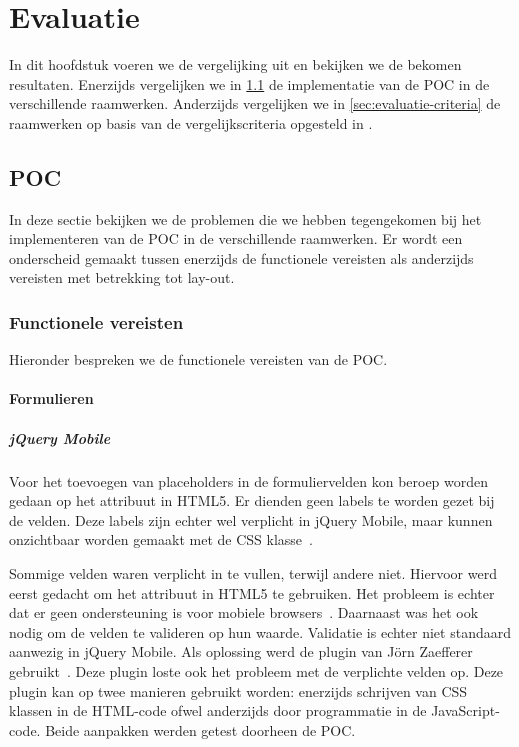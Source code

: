 \chapter{Evaluatie}
\label{chap:evaluatie}

In dit hoofdstuk voeren we de vergelijking uit en bekijken we de bekomen resultaten.
Enerzijds vergelijken we in \ref{sec:evaluatie-poc} de implementatie van de POC in de verschillende raamwerken.
Anderzijds vergelijken we in \ref{sec:evaluatie-criteria} de raamwerken op basis van de vergelijkscriteria opgesteld in .


\section{POC}
\label{sec:evaluatie-poc}
In deze sectie bekijken we de problemen die we hebben tegengekomen bij het implementeren van de POC in de verschillende raamwerken.
Er wordt een onderscheid gemaakt tussen enerzijds de functionele vereisten als anderzijds vereisten met betrekking tot lay-out.

\subsection{Functionele vereisten}
Hieronder bespreken we de functionele vereisten van de POC.

\subsubsection{Formulieren}

\paragraph{jQuery Mobile} 
Voor het toevoegen van placeholders in de formuliervelden kon beroep worden gedaan op het  attribuut in HTML5. Er dienden geen labels te worden gezet bij de velden. Deze labels zijn echter wel verplicht in jQuery Mobile, maar kunnen onzichtbaar worden gemaakt met de  CSS klasse~\cite{JQuery2013}.

Sommige velden waren verplicht in te vullen, terwijl andere niet. Hiervoor werd eerst gedacht om het  attribuut in HTML5 te gebruiken. Het probleem is echter dat er geen ondersteuning is voor mobiele browsers~\cite{Deveria2013}. Daarnaast was het ook nodig om de velden te valideren op hun waarde. Validatie is echter niet standaard aanwezig in jQuery Mobile. Als oplossing werd de plugin van Jörn Zaefferer gebruikt~\cite{Zaefferer2013}. Deze plugin loste ook het probleem met de verplichte velden op. Deze plugin kan op twee manieren gebruikt worden: enerzijds schrijven van CSS klassen in de HTML-code ofwel anderzijds door programmatie in de JavaScript-code. Beide aanpakken werden getest doorheen de POC. 

